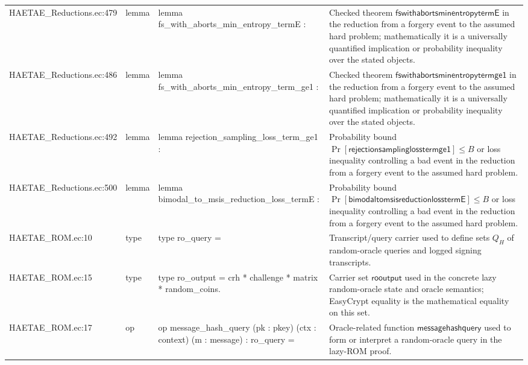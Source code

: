 \documentclass[10pt]{article}
\begin{document}
\begin{longtable}{L{0.11\textwidth}L{0.055\textwidth}L{0.385\textwidth}L{0.41\textwidth}}
HAETAE\_\allowbreak{}Reductions.\allowbreak{}ec:\allowbreak{}479 & lemma & {\ttfamily\scriptsize lemma fs\_\allowbreak{}with\_\allowbreak{}aborts\_\allowbreak{}min\_\allowbreak{}entropy\_\allowbreak{}termE :} & Checked theorem $\mathsf{fswithabortsminentropytermE}$ in the reduction from a forgery event to the assumed hard problem; mathematically it is a universally quantified implication or probability inequality over the stated objects. \\
HAETAE\_\allowbreak{}Reductions.\allowbreak{}ec:\allowbreak{}486 & lemma & {\ttfamily\scriptsize lemma fs\_\allowbreak{}with\_\allowbreak{}aborts\_\allowbreak{}min\_\allowbreak{}entropy\_\allowbreak{}term\_\allowbreak{}ge1 :} & Checked theorem $\mathsf{fswithabortsminentropytermge1}$ in the reduction from a forgery event to the assumed hard problem; mathematically it is a universally quantified implication or probability inequality over the stated objects. \\
HAETAE\_\allowbreak{}Reductions.\allowbreak{}ec:\allowbreak{}492 & lemma & {\ttfamily\scriptsize lemma rejection\_\allowbreak{}sampling\_\allowbreak{}loss\_\allowbreak{}term\_\allowbreak{}ge1 :} & Probability bound $\Pr[\mathsf{rejectionsamplinglosstermge1}]\le B$ or loss inequality controlling a bad event in the reduction from a forgery event to the assumed hard problem. \\
HAETAE\_\allowbreak{}Reductions.\allowbreak{}ec:\allowbreak{}500 & lemma & {\ttfamily\scriptsize lemma bimodal\_\allowbreak{}to\_\allowbreak{}msis\_\allowbreak{}reduction\_\allowbreak{}loss\_\allowbreak{}termE :} & Probability bound $\Pr[\mathsf{bimodaltomsisreductionlosstermE}]\le B$ or loss inequality controlling a bad event in the reduction from a forgery event to the assumed hard problem. \\
HAETAE\_\allowbreak{}ROM.\allowbreak{}ec:\allowbreak{}10 & type & {\ttfamily\scriptsize type ro\_\allowbreak{}query =} & Transcript/query carrier used to define sets $Q_H$ of random-oracle queries and logged signing transcripts. \\
HAETAE\_\allowbreak{}ROM.\allowbreak{}ec:\allowbreak{}15 & type & {\ttfamily\scriptsize type ro\_\allowbreak{}output = crh * challenge * matrix * random\_\allowbreak{}coins.} & Carrier set $\mathsf{rooutput}$ used in the concrete lazy random-oracle state and oracle semantics; EasyCrypt equality is the mathematical equality on this set. \\
HAETAE\_\allowbreak{}ROM.\allowbreak{}ec:\allowbreak{}17 & op & {\ttfamily\scriptsize op message\_\allowbreak{}hash\_\allowbreak{}query (pk : pkey) (ctx : context) (m : message) : ro\_\allowbreak{}query =} & Oracle-related function $\mathsf{messagehashquery}$ used to form or interpret a random-oracle query in the lazy-ROM proof. \\

\end{longtable}
\end{document}
